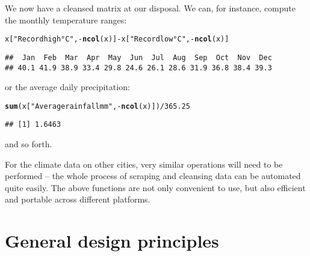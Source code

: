 \documentclass[nojss]{jss}\usepackage[]{graphicx}\usepackage[]{xcolor}
\makeatletter
\newcommand{\hlnum}[1]{\textcolor[rgb]{0.686,0.059,0.569}{#1}}%
\newcommand{\hlstr}[1]{\textcolor[rgb]{0.192,0.494,0.8}{#1}}%
\newcommand{\hlopt}[1]{\textcolor[rgb]{0,0,0}{#1}}%
\newcommand{\hlstd}[1]{\textcolor[rgb]{0.345,0.345,0.345}{#1}}%
\newcommand{\hlkwd}[1]{\textcolor[rgb]{0.737,0.353,0.396}{\textbf{#1}}}%
\newenvironment{kframe}{%
 \def\at@end@of@kframe{}%
 \ifinner\ifhmode%
  \def\at@end@of@kframe{\end{minipage}}%
  \begin{minipage}{\columnwidth}%
 \fi\fi%
 \def\FrameCommand##1{\hskip\@totalleftmargin \hskip-\fboxsep
 \colorbox{shadecolor}{##1}\hskip-\fboxsep
     \hskip-\linewidth \hskip-\@totalleftmargin \hskip\columnwidth}%
 \MakeFramed {\advance\hsize-\width
   \@totalleftmargin\z@ \linewidth\hsize
   \@setminipage}}%
 {\par\unskip\endMakeFramed%
 \at@end@of@kframe}
\newenvironment{knitrout}{}{} %
\makeatother
\begin{document}
We now have a cleansed matrix at our disposal.
We can, for instance, compute the monthly temperature ranges:

\begin{knitrout}
\color{fgcolor}\begin{kframe}
\begin{alltt}
\hlstd{x[}\hlstr{"Record high °C"}\hlstd{,} \hlopt{-}\hlkwd{ncol}\hlstd{(x)]} \hlopt{-} \hlstd{x[}\hlstr{"Record low °C"}\hlstd{,} \hlopt{-}\hlkwd{ncol}\hlstd{(x)]}
\end{alltt}
\begin{verbatim}
##  Jan  Feb  Mar  Apr  May  Jun  Jul  Aug  Sep  Oct  Nov  Dec 
## 40.1 41.9 38.9 33.4 29.8 24.6 26.1 28.6 31.9 36.8 38.4 39.3
\end{verbatim}
\end{kframe}
\end{knitrout}

\noindent
or the average daily precipitation:

\begin{knitrout}
\color{fgcolor}\begin{kframe}
\begin{alltt}
\hlkwd{sum}\hlstd{(x[}\hlstr{"Average rainfall mm"}\hlstd{,} \hlopt{-}\hlkwd{ncol}\hlstd{(x)])} \hlopt{/} \hlnum{365.25}
\end{alltt}
\begin{verbatim}
## [1] 1.6463
\end{verbatim}
\end{kframe}
\end{knitrout}

\noindent
and so forth.

For the climate data on other cities, very similar operations
will need to be performed -- the whole process of scraping and cleansing data
can be automated quite easily.
The above functions are not only convenient to use, but also efficient
and portable across different platforms.




\section{General design principles}\label{Sec:design}
\end{document}
